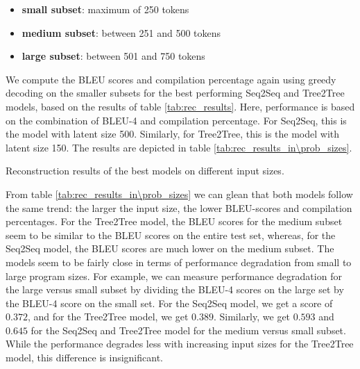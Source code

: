 \begin{itemize}
    \item \textbf{small subset}: maximum of 250 tokens
    \item \textbf{medium subset}: between 251 and 500 tokens
    \item \textbf{large subset}: between 501 and 750 tokens
\end{itemize}

 

We compute the BLEU scores and compilation percentage again using greedy decoding on the smaller subsets for the best performing Seq2Seq and Tree2Tree models, based on the results of table \ref{tab:rec_results}. Here, performance is based on the combination of BLEU-4 and compilation percentage. For Seq2Seq, this is the model with latent size 500. Similarly, for Tree2Tree, this is the model with latent size 150. The results are depicted in table \ref{tab:rec_results_in\prob_sizes}.






\begin{table}
\centering

\caption{Reconstruction results of the best models on different input sizes.}
\label{tab:rec_results_in\prob_sizes}
\end{table}



From table \ref{tab:rec_results_in\prob_sizes} we can glean that both models follow the same trend: the larger the input size, the lower BLEU-scores and compilation percentages. For the Tree2Tree model, the BLEU scores for the medium subset seem to be similar to the BLEU scores on the entire test set, whereas, for the Seq2Seq model, the BLEU scores are much lower on the medium subset. The models seem to be fairly close in terms of performance degradation from small to large program sizes. For example, we can measure performance degradation for the large versus small subset by dividing the BLEU-4 scores on the large set by the BLEU-4 score on the small set. For the Seq2Seq model, we get a score of $0.372$, and for the Tree2Tree model, we get $0.389$. Similarly, we get $0.593$ and $0.645$ for the Seq2Seq and Tree2Tree model for the medium versus small subset. While the performance degrades less with increasing input sizes for the Tree2Tree model, this difference is insignificant. 

